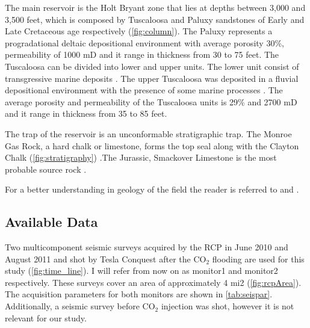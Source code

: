 The main reservoir is the Holt Bryant zone that lies at depths between 3,000 and 3,500
feet,  which is composed by Tuscaloosa and Paluxy sandstones of Early and Late Cretaceous age 
respectively (\ref{fig:column}). The Paluxy represents a progradational deltaic depositional environment
 \citep{ref:nick} with average porosity 30\%, permeability of 1000 mD and it range in thickness
from 30 to 75 feet. The Tuscaloosa can be divided into lower and upper units. The lower unit 
consist of transgressive marine deposits \citep{ref:doug}.
The upper Tuscaloosa was deposited in a fluvial depositional environment with the presence of some marine
processes \citep{ref:doug}. The average porosity and permeability of the Tuscaloosa units is 29\%
 and 2700 mD and it range in thickness from 35 to 85 feet. 

The trap of the reservoir is an unconformable stratigraphic trap. The Monroe Gas Rock, 
a hard chalk or  limestone, forms the top seal \citep{ref:powell} along with the Clayton Chalk (\ref{fig:stratigraphy}) 
\citep{ref:nick}.The Jurassic, Smackover Limestone is the most probable source rock \citep{ref:mancini}.

For a better understanding in geology of the field the reader is referred 
to \citep{ref:nick} and \citep{ref:doug}.



\newpage

\subsection{Available Data}

Two multicomponent seismic surveys acquired by the RCP in June 2010 and 
August 2011 and shot by Tesla Conquest after the CO$_2$ flooding are used 
for this study (\ref{fig:time_line}).  I will refer from now on as monitor1 
and monitor2 respectively. These surveys cover an area of approximately 
4 mi2 (\ref{fig:rcpArea}). The acquisition parameters for both monitors
are shown in \ref{tab:seispar}. Additionally, a seismic survey before
CO$_2$ injection was shot, however it is not relevant for our study.

